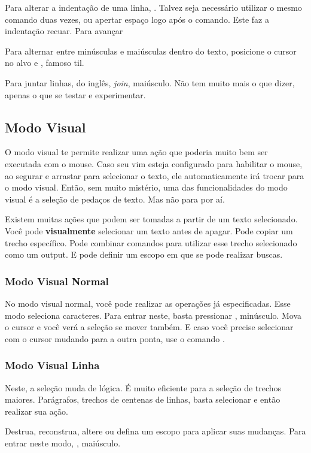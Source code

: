 Para alterar a indentação de uma linha, \vimcommand{$<$}.
Talvez seja necessário utilizar o mesmo comando duas vezes, ou apertar espaço logo após o comando.
Este faz a indentação recuar.
Para avançar \vimcommand{$>$}

Para alternar entre minúsculas e maiúsculas dentro do texto, posicione o cursor no alvo
e \vimcommand{\~}, famoso til. 

Para juntar linhas, do inglês, \textit{join},  maiúsculo.
Não tem muito mais o que dizer, apenas o que se testar e experimentar.

\subsection{Modo Visual}
O modo visual te permite realizar uma ação que poderia muito bem ser executada com o mouse.
Caso seu vim esteja configurado para habilitar o mouse, ao segurar e arrastar para selecionar o texto, ele automaticamente irá trocar para o modo visual.
Então, sem muito mistério, uma das funcionalidades do modo visual é a seleção de pedaços de texto. Mas não para por aí.

Existem muitas ações que podem ser tomadas a partir de um texto selecionado. Você pode \textbf{visualmente} selecionar um texto antes de apagar.
Pode copiar um trecho específico.
Pode combinar comandos para utilizar esse trecho selecionado como um output.
E pode definir um escopo em que se pode realizar buscas.

\subsubsection{Modo Visual Normal}
No modo visual normal, você pode realizar as operações já especificadas.
Esse modo seleciona caracteres.
Para entrar neste, basta pressionar , minúsculo.
Mova o cursor e você verá a seleção se mover também.
E caso você precise selecionar com o cursor mudando para a outra ponta, use o comando .

\subsubsection{Modo Visual Linha}
Neste, a seleção muda de lógica.
É muito eficiente para a seleção de trechos maiores.
Parágrafos, trechos de centenas de linhas, basta selecionar e então realizar sua ação.

Destrua, reconstrua, altere ou defina um escopo para aplicar suas mudanças.
Para entrar neste modo, , maiúsculo.

